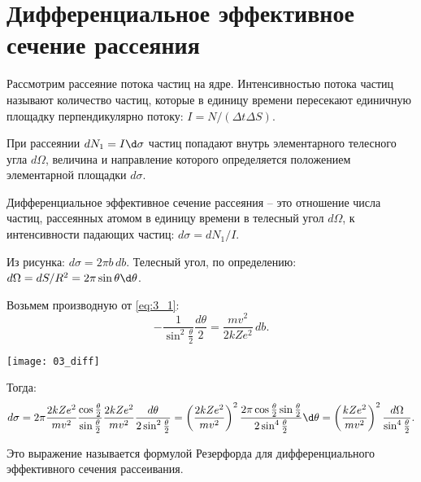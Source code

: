 \section{Дифференциальное эффективное сечение рассеяния}

\begin{minipage}{.6\textwidth}
Рассмотрим рассеяние потока частиц на ядре. Интенсивностью потока частиц
называют количество частиц, которые в единицу времени пересекают единичную
площадку перпендикулярно потоку: \( I = N/(\Delta t\Delta S) \).
 
При рассеянии \( dN_1 = I\d\sigma \) частиц попадают внутрь элементарного
телесного угла \( d\Omega \), величина и направление которого определяется
положением элементарной площадки \( d\sigma \).
\end{minipage}

\begin{minipage}{.55\textwidth}
Дифференциальное эффективное сечение рассеяния -- это отношение числа частиц,
рассеянных атомом в единицу времени в телесный угол \( d\Omega \), к
интенсивности падающих частиц: \( d\sigma = dN_1/I \).

Из рисунка: \( d\sigma = 2\pi b\,db \). Телесный угол, по определению:
\( d\Omega = dS/R^2 = 2\pi\sin\theta\d\theta \).

Возьмем производную от \eqref{eq:3_1}:
\[
    -\frac{1}{\sin^2\frac{\theta}{2}}\frac{d\theta}{2} = \frac{mv^2}{2kZe^2}\,db.
\]
\end{minipage}
\begin{minipage}{.4\textwidth}
    \texttt{[image: 03\_diff]}
\end{minipage}
Тогда:
\[
    d\sigma = 2\pi\frac{2kZe^2}{mv^2}\frac{\cos\frac{\theta}{2}}{\sin\frac
    {\theta}{2}}\frac{2kZe^2}{mv^2}\frac{d\theta}{2\sin^2\frac{\theta}{2}} =
    \left( \frac{2kZe^2}{mv^2} \right)^2 \frac{2\pi\cos\frac{\theta}{2}\sin
    \frac{\theta}{2}}{2\sin^4\frac{\theta}{2}}\d\theta = \left( \frac{kZe^2}
    {mv^2} \right)^2 \frac{d\Omega}{\sin^4\frac{\theta}{2}}.
\]

Это выражение называется формулой Резерфорда для дифференциального эффективного
сечения рассеивания.

\newpage
